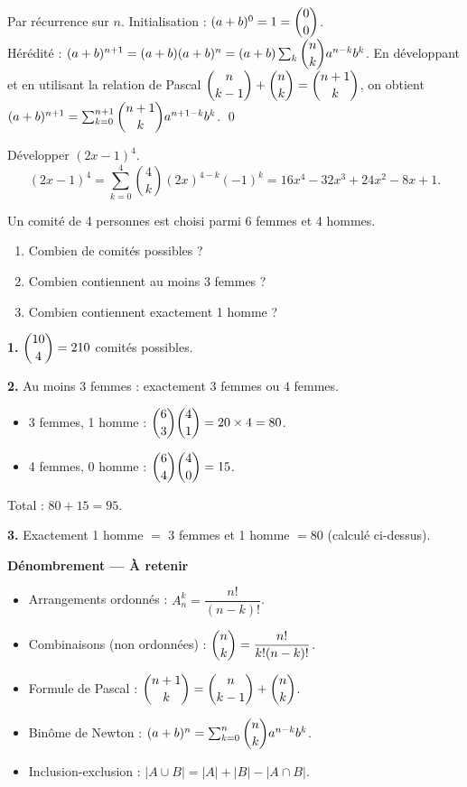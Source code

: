 \documentclass[11pt,a4paper,twoside]{book}
\begin{document}
\begin{preuvebox}
Par récurrence sur $n$. Initialisation : $(a+b)^0 = 1 = \dbinom{0}{0}$. \\
Hérédité : $(a+b)^{n+1} = (a+b)(a+b)^n = (a+b)\sum_k \dbinom{n}{k} a^{n-k}b^k$.
En développant et en utilisant la relation de Pascal $\dbinom{n}{k-1}+\dbinom{n}{k}=\dbinom{n+1}{k}$,
on obtient $(a+b)^{n+1} = \sum_{k=0}^{n+1}\dbinom{n+1}{k}a^{n+1-k}b^k$. \qed
\end{preuvebox}

\begin{exemplebox}
Développer $(2x-1)^4$.
\[
  (2x-1)^4 = \sum_{k=0}^4 \binom{4}{k}(2x)^{4-k}(-1)^k
  = 16x^4 - 32x^3 + 24x^2 - 8x + 1.
\]
\end{exemplebox}

\begin{exercicebox}
Un comité de 4 personnes est choisi parmi 6 femmes et 4 hommes.
\begin{enumerate}
  \item Combien de comités possibles ?
  \item Combien contiennent au moins 3 femmes ?
  \item Combien contiennent exactement 1 homme ?
\end{enumerate}
\end{exercicebox}

\begin{correctionbox}[Correction]
\textbf{1.} $\dbinom{10}{4} = 210$ comités possibles.

\textbf{2.} Au moins 3 femmes : exactement 3 femmes ou 4 femmes.
\begin{itemize}
  \item 3 femmes, 1 homme : $\dbinom{6}{3}\dbinom{4}{1} = 20 \times 4 = 80$.
  \item 4 femmes, 0 homme : $\dbinom{6}{4}\dbinom{4}{0} = 15$.
\end{itemize}
Total : $80 + 15 = 95$.

\textbf{3.} Exactement 1 homme $=$ 3 femmes et 1 homme $= 80$ (calculé ci-dessus).
\end{correctionbox}

\begin{retenirbox}
\textbf{Dénombrement — À retenir}
\begin{itemize}
  \item Arrangements ordonnés : $A_n^k = \dfrac{n!}{(n-k)!}$.
  \item Combinaisons (non ordonnées) : $\dbinom{n}{k} = \dfrac{n!}{k!(n-k)!}$.
  \item Formule de Pascal : $\dbinom{n+1}{k} = \dbinom{n}{k-1}+\dbinom{n}{k}$.
  \item Binôme de Newton : $(a+b)^n = \sum_{k=0}^n \dbinom{n}{k}a^{n-k}b^k$.
  \item Inclusion-exclusion : $|A \cup B| = |A|+|B|-|A\cap B|$.
\end{itemize}
\end{retenirbox}
\end{document}
